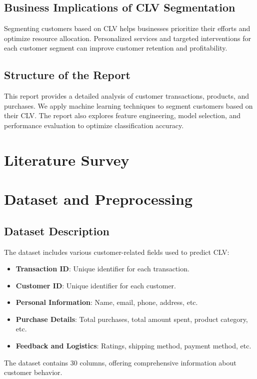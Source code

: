 \documentclass{article}
\begin{document}
\subsection{Business Implications of CLV Segmentation}
Segmenting customers based on CLV helps businesses prioritize their efforts and optimize resource allocation. Personalized services and targeted interventions for each customer segment can improve customer retention and profitability.

\subsection{Structure of the Report}
This report provides a detailed analysis of customer transactions, products, and purchases. We apply machine learning techniques to segment customers based on their CLV. The report also explores feature engineering, model selection, and performance evaluation to optimize classification accuracy.

\section{Literature Survey}

\section{Dataset and Preprocessing}

\subsection{Dataset Description}
The dataset includes various customer-related fields used to predict CLV:
\begin{itemize}
    \item \textbf{Transaction ID}: Unique identifier for each transaction.
    \item \textbf{Customer ID}: Unique identifier for each customer.
    \item \textbf{Personal Information}: Name, email, phone, address, etc.
    \item \textbf{Purchase Details}: Total purchases, total amount spent, product category, etc.
    \item \textbf{Feedback and Logistics}: Ratings, shipping method, payment method, etc.
\end{itemize}
The dataset contains 30 columns, offering comprehensive information about customer behavior.
\end{document}

